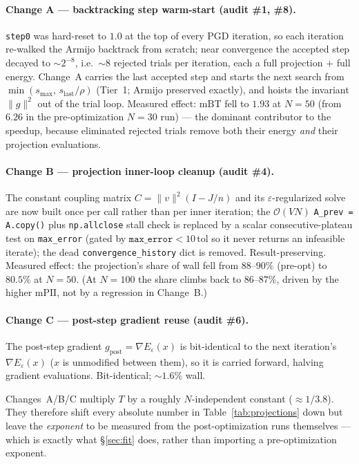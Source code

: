 \documentclass[11pt,a4paper]{article}
\begin{document}
\paragraph{Change A --- backtracking step warm-start (audit \#1, \#8).}
\texttt{step0} was hard-reset to $1.0$ at the top of every PGD iteration, so
each iteration re-walked the Armijo backtrack from scratch; near convergence
the accepted step decayed to $\sim\!2^{-8}$, i.e.\ $\sim\!8$ rejected trials
per iteration, each a full projection $+$ full energy.  Change~A carries the
last accepted step and starts the next search from
$\min(s_{\max},\,s_{\text{last}}/\rho)$ (Tier~1; Armijo preserved exactly),
and hoists the invariant $\|g\|^2$ out of the trial loop.  Measured effect:
$\mathrm{mBT}$ fell to $1.93$ at $N=50$ (from $6.26$ in the pre-optimization
$N=30$ run) --- the dominant contributor to the speedup, because eliminated
rejected trials remove both their energy \emph{and} their projection
evaluations.

\paragraph{Change B --- projection inner-loop cleanup (audit \#4).}
The constant coupling matrix $C = \|v\|^2(I - J/n)$ and its
$\varepsilon$-regularized solve are now built once per call rather than per
inner iteration; the $\mathcal{O}(VN)$ \texttt{A\_prev = A.copy()} plus
\texttt{np.allclose} stall check is replaced by a scalar consecutive-plateau
test on \texttt{max\_error} (gated by $\texttt{max\_error} < 10\,\mathrm{tol}$
so it never returns an infeasible iterate); the dead
\texttt{convergence\_history} dict is removed.  Result-preserving.  Measured
effect: the projection's share of wall fell from $88$--$90\%$ (pre-opt) to
$80.5\%$ at $N=50$.  (At $N=100$ the share climbs back to $86$--$87\%$, driven
by the higher $\mathrm{mPII}$, not by a regression in Change~B.)

\paragraph{Change C --- post-step gradient reuse (audit \#6).}
The post-step gradient $g_{\text{post}} = \nabla E_\varepsilon(x)$ is
bit-identical to the next iteration's $\nabla E_\varepsilon(x)$ ($x$ is
unmodified between them), so it is carried forward, halving gradient
evaluations.  Bit-identical; $\sim\!1.6\%$ wall.

\begin{remark}
Changes~A/B/C multiply $T$ by a roughly $N$-independent constant
($\approx\!1/3.8$).  They therefore shift every absolute number in
Table~\ref{tab:projections} down but leave the \emph{exponent} to be measured
from the post-optimization runs themselves --- which is exactly what
\S\ref{sec:fit} does, rather than importing a pre-optimization exponent.
\end{remark}
\end{document}
